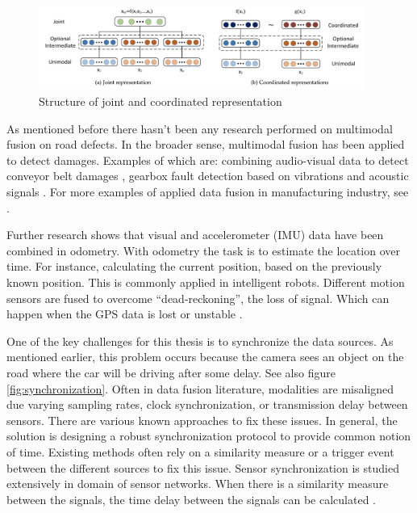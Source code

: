 \begin{figure}[ht]
\begin{center}
\includegraphics[width=0.95\textwidth,keepaspectratio]{images/2_literature/joint-vs-coordinated-representations.png}
\end{center}
\captionsetup{width=.90\textwidth}
\caption{Structure of joint and coordinated representation \cite{Baltrusaitis2017}}
\label{fig:structure-joint-coordinated}
\end{figure}

As mentioned before there hasn't been any research performed on multimodal fusion on road defects. In the broader sense, multimodal fusion has been applied to detect damages. Examples of which are: combining audio-visual data to detect conveyor belt damages \cite{Che2021}, gearbox fault detection based on vibrations and acoustic signals \cite{Li2016}. For more examples of applied data fusion in manufacturing industry, see \cite{Olivan2018}.

Further research shows that visual and accelerometer (IMU) data have been combined in odometry. With odometry the task is to estimate the location over time. For instance, calculating the current position, based on the previously known position. This is commonly applied in intelligent robots. Different motion sensors are fused to overcome ``dead-reckoning'', the loss of signal. Which can happen when the GPS data is lost or unstable \cite{Jiang2017,Brossard2020}.

One of the key challenges for this thesis is to synchronize the data sources. As mentioned earlier, this problem occurs because the camera sees an object on the road where the car will be driving after some delay. See also figure \ref{fig:synchronization}. Often in data fusion literature, modalities are misaligned due varying sampling rates, clock synchronization, or transmission delay between sensors. There are various known approaches to fix these issues. In general, the solution is designing a robust synchronization protocol to provide common notion of time. Existing methods often rely on a similarity measure or a trigger event between the different sources to fix this issue. Sensor synchronization is studied extensively in domain of sensor networks. When there is a similarity measure between the signals, the time delay between the signals can be calculated \cite{Liu2021}.


